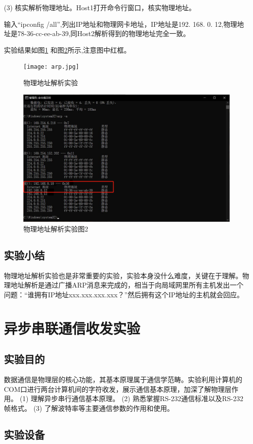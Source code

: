 \documentclass[lang=cn,11pt,a4paper,cite=authoryear]{elegantpaper}
\begin{document}
(3)	核实解析物理地址。Host1打开命令行窗口，核实物理地址。

输入“ipconfig /all”,列出IP地址和物理网卡地址，IP地址是192. 168. 0. 12,物理地址是78-36-cc-ee-ab-39,同Host2解析得到的物理地址完全一致。

实验结果如图\ref{fig:arp} 和图\ref{fig:screenshot012}所示,注意图中红框。

\begin{figure}[htbp]
	\centering
	\texttt{[image: arp.jpg]}
	\caption{物理地址解析实验}
	\label{fig:arp}
\end{figure}


\begin{figure}[htbp]
	\centering
	\includegraphics[width=0.7\linewidth]{image/screenshot012}
	\caption{物理地址解析实验图2}
	\label{fig:screenshot012}
\end{figure}


\subsection{实验小结}
物理地址解析实验也是非常重要的实验，实验本身没什么难度，关键在于理解。物理地址解析是通过广播ARP消息来完成的，相当于向局域网里所有主机发出一个问题：“谁拥有IP地址xxx.xxx.xxx.xxx？”然后拥有这个IP地址的主机就会回应。


\section{异步串联通信收发实验}
\subsection{实验目的}
数据通信是物理层的核心功能，其基本原理属于通信学范畴。实验利用计算机的COM口进行两台计算机间的字符收发，展示通信基本原理，加深了解物理层作用。
(1)	理解异步串行通信基本原理。
(2)	熟悉掌握RS-232通信标准以及RS-232帧格式。
(3)	了解波特率等主要通信参数的作用和使用。

\subsection{实验设备}
\end{document}
